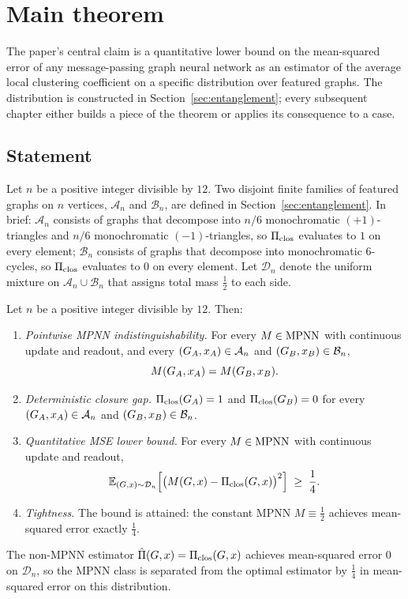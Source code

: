 
\section{Main theorem}\label{sec:main}

The paper's central claim is a quantitative lower bound on the
mean-squared error of any message-passing graph neural network as
an estimator of the average local clustering coefficient on a
specific distribution over featured graphs. The distribution is
constructed in Section~\ref{sec:entanglement}; every subsequent chapter
either builds a piece of the theorem or applies its consequence to
a case.

\subsection{Statement}

Let $n$ be a positive integer divisible by $12$. Two disjoint finite
families of featured graphs on $n$ vertices, $\mathcal{A}_n$ and
$\mathcal{B}_n$, are defined in Section~\ref{sec:entanglement}. In brief:
$\mathcal{A}_n$ consists of graphs that decompose into $n/6$
monochromatic $(+1)$-triangles and $n/6$ monochromatic
$(-1)$-triangles, so $\Pi_{\mathrm{clos}}$ evaluates to $1$ on every element;
$\mathcal{B}_n$ consists of graphs that decompose into monochromatic
$6$-cycles, so $\Pi_{\mathrm{clos}}$ evaluates to $0$ on every element. Let
$\mathcal{D}_n$ denote the uniform mixture on $\mathcal{A}_n \cup
\mathcal{B}_n$ that assigns total mass $\tfrac{1}{2}$ to each side.

\begin{theorem}\label{thm:main}
Let $n$ be a positive integer divisible by $12$. Then:
\begin{enumerate}
\item[(i)] \emph{Pointwise MPNN indistinguishability.} For every $M
\in \mathrm{MPNN}$ with continuous update and readout, and every $(G_A,
x_A) \in \mathcal{A}_n$ and $(G_B, x_B) \in \mathcal{B}_n$,
\[
M(G_A, x_A) = M(G_B, x_B).
\]
\item[(ii)] \emph{Deterministic closure gap.} $\Pi_{\mathrm{clos}}(G_A) =
1$ and $\Pi_{\mathrm{clos}}(G_B) = 0$ for every $(G_A, x_A) \in
\mathcal{A}_n$ and $(G_B, x_B) \in \mathcal{B}_n$.
\item[(iii)] \emph{Quantitative MSE lower bound.} For every $M \in
\mathrm{MPNN}$ with continuous update and readout,
\[
\mathbb{E}_{(G, x) \sim \mathcal{D}_n}\!\left[\bigl(M(G, x) -
\Pi_{\mathrm{clos}}(G, x)\bigr)^2\right] \;\ge\; \frac{1}{4}.
\]
\item[(iv)] \emph{Tightness.} The bound is attained: the constant
MPNN $M \equiv \tfrac{1}{2}$ achieves mean-squared error exactly
$\tfrac{1}{4}$.
\end{enumerate}
The non-MPNN estimator $\hat{\Pi}(G, x) = \Pi_{\mathrm{clos}}(G, x)$
achieves mean-squared error $0$ on $\mathcal{D}_n$, so the MPNN
class is separated from the optimal estimator by
$\tfrac{1}{4}$ in mean-squared error on this distribution.
\end{theorem}

